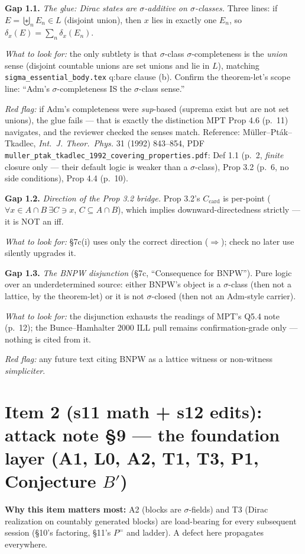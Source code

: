\documentclass[11pt]{article}
\newcommand{\file}[1]{\texttt{\small #1}}
\newcommand{\gap}[1]{\medskip\noindent\textbf{Gap #1.}}
\newcommand{\lookfor}{\par\smallskip\noindent\emph{What to look for:} }
\newcommand{\redflag}{\par\smallskip\noindent\emph{Red flag:} }
\begin{document}
\gap{1.1} \emph{The glue: Dirac states are $\sigma$-additive on
$\sigma$-classes.} Three lines: if $E = \biguplus_n E_n \in L$
(disjoint union), then $x$ lies in exactly one $E_n$, so
$\delta_x(E) = \sum_n \delta_x(E_n)$.
\lookfor the only subtlety is that $\sigma$-class
$\sigma$-completeness is the \emph{union} sense (disjoint countable
unions are set unions and lie in $L$), matching
\file{sigma\_essential\_body.tex} q:bare clause (b). Confirm the
theorem-let's scope line: ``Adm's $\sigma$-completeness IS the
$\sigma$-class sense.''
\redflag if Adm's completeness were \emph{sup}-based (suprema exist
but are not set unions), the glue fails --- that is exactly the
distinction MPT Prop 4.6 (p.~11) navigates, and the reviewer checked
the senses match. Reference: M\"uller--Pt\'ak--Tkadlec, \emph{Int.\ J.
Theor.\ Phys.} 31 (1992) 843--854, PDF
\file{muller\_ptak\_tkadlec\_1992\_covering\_properties.pdf}: Def
1.1 (p.~2, \emph{finite} closure only --- their default logic is
weaker than a $\sigma$-class), Prop 3.2 (p.~6, no side conditions),
Prop 4.4 (p.~10).

\gap{1.2} \emph{Direction of the Prop 3.2 bridge.} Prop 3.2's
$C_{\mathrm{card}}$ is per-point ($\forall x \in A\cap B\ \exists C
\ni x$, $C \subseteq A \cap B$), which implies downward-directedness
strictly --- it is NOT an iff.
\lookfor \S7c(i) uses only the correct direction
($\Rightarrow$); check no later use silently upgrades it.

\gap{1.3} \emph{The BNPW disjunction} (\S7c, ``Consequence for
BNPW''). Pure logic over an underdetermined source: either BNPW's
object is a $\sigma$-class (then not a lattice, by the theorem-let)
or it is not $\sigma$-closed (then not an Adm-style carrier).
\lookfor the disjunction exhausts the readings of MPT's Q5.4 note
(p.~12); the Bunce--Hamhalter 2000 ILL pull remains
confirmation-grade only --- nothing is cited from it.
\redflag any future text citing BNPW as a lattice witness or
non-witness \emph{simpliciter}.

\section{Item 2 (s11 math + s12 edits): attack note \S9 --- the
foundation layer (A1, L0, A2, T1, T3, P1, Conjecture $B'$)}

\noindent\textbf{Why this item matters most:} A2 (blocks are
$\sigma$-fields) and T3 (Dirac realization on countably generated
blocks) are load-bearing for every subsequent session (\S10's
factoring, \S11's $P^=$ and ladder). A defect here propagates
everywhere.
\end{document}
